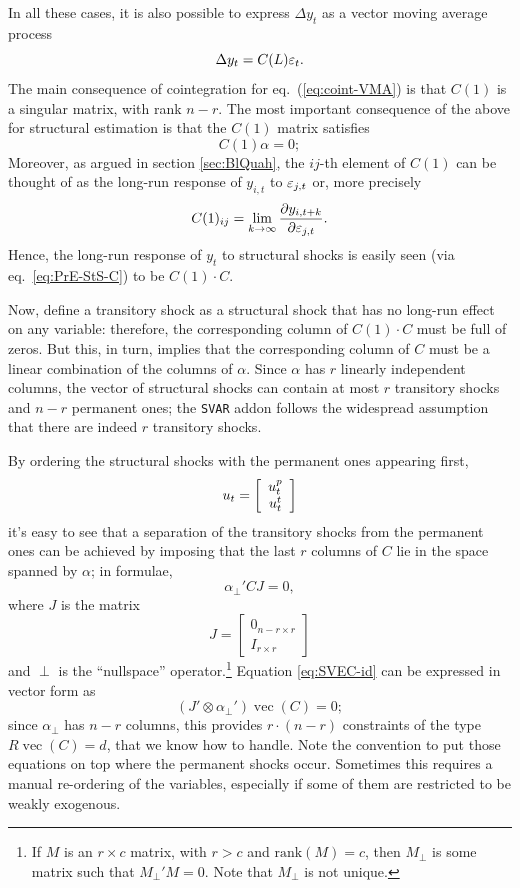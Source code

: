 \documentclass[a4paper,10pt]{article}
\newcommand{\PrE}[1]{\ensuremath \varepsilon_{#1}}
\newcommand{\StS}[1]{\ensuremath u_{#1}}
\newcommand{\pder}[2]{\ensuremath\frac{\partial #1}{\partial #2}}
\DeclareMathOperator{\VEC}{\mathrm{vec}}
\newcommand{\rk}[1]{\mathrm{rank}\left(#1\right)}
\begin{document}
In all these cases, it is also possible to express $\Delta y_{t}$ as a
vector moving average process
\begin{equation}
  \label{eq:coint-VMA}
  \Delta y_t = C(L) \PrE{t} .
\end{equation}
The main consequence of cointegration for eq.~(\ref{eq:coint-VMA}) is
that $C(1)$ is a singular matrix, with rank $n-r$.  The most important
consequence of the above for structural estimation is that the $C(1)$
matrix satisfies
\[
  C(1) \alpha = 0 ;
\]
Moreover, as argued in section \ref{sec:BlQuah}, the $ij$-th element
of $C(1)$ can be thought of as the long-run response of $y_{i,t}$ to
$\PrE{j,t}$ or, more precisely
\[
  C(1)_{ij} = \lim_{k \to \infty} \pder{y_{i, t+k}}{\PrE{j, t}}.
\]
Hence, the long-run response of $y_t$ to structural shocks is easily
seen (via eq.~\ref{eq:PrE-StS-C}) to be $C(1) \cdot C$.

Now, define a transitory shock as a structural shock that has no
long-run effect on any variable: therefore, the corresponding column
of $C(1) \cdot C$ must be full of zeros. But this, in turn, implies
that the corresponding column of $C$ must be a linear combination of
the columns of $\alpha$. Since $\alpha$ has $r$ linearly independent
columns, the vector of structural shocks can contain at most $r$ transitory
shocks and $n-r$ permanent ones; the \texttt{SVAR} addon follows the 
widespread assumption that there are indeed $r$ transitory shocks.

By ordering the structural shocks with the permanent ones appearing first,
\[
  \StS{t} = \left[ \begin{array}{c} \StS{t}^p \\ \StS{t}^t  \end{array}\right] 
\] 
it's easy to see that a separation of the transitory shocks from the
permanent ones can be achieved by imposing that the last $r$ columns
of $C$ lie in the space spanned by $\alpha$; in formulae,
\begin{equation}
  \label{eq:SVEC-id}
  \alpha_{\perp}' C J = 0 ,
\end{equation}
where $J$ is the matrix 
\[ 
  J = \left[ \begin{array}{c} 0_{n-r \times r} \\ 
      I_{r\times r}  \end{array}\right] 
\]
and $\perp$ is the ``nullspace'' operator.\footnote{If $M$ is an $r
  \times c$ matrix, with $r>c$ and $\rk{M} = c$, then $M_{\perp}$ is
  some matrix such that $M_{\perp}'M = 0$.  Note that $M_{\perp}$ is
  not unique.} Equation \eqref{eq:SVEC-id} can be expressed in vector
form as
\[
  ( J' \otimes \alpha_{\perp}' ) \VEC(C)  = 0 ;
\]
since $\alpha_{\perp}$ has $n-r$ columns, this provides $r\cdot(n-r)$
constraints of the type $R \VEC(C) = d$, that we know how to handle.
Note the convention to put those equations on top where the permanent 
shocks occur. Sometimes this requires a manual re-ordering of the variables, 
especially if some of them are restricted to be weakly exogenous.
\end{document}
